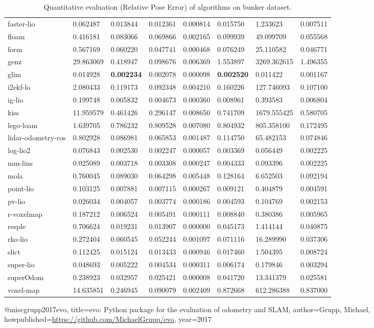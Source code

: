 \begin{table}[]
{\begin{tabular}{llllllll}
		faster-lio & 0.062487 & 0.013844 & 0.012361 & 0.000814 & 0.015750 & 1.233623 & 0.007511 \\
		floam & 0.416181 & 0.083066 & 0.069866 & 0.002165 & 0.099939 & 49.099709 & 0.055568 \\
		form & 0.567169 & 0.060220 & 0.047741 & 0.000468 & 0.076249 & 25.110582 & 0.046771 \\
		genz & 29.863069 & 0.418947 & 0.098676 & 0.006369 & 1.553897 & 3269.362615 & 1.496355 \\
		glim & 0.014928 & \textbf{0.002234} & 0.002078 & 0.000098 & \textbf{0.002520} & 0.011422 & 0.001167 \\
		i2ekf-lo & 2.080433 & 0.119173 & 0.092348 & 0.004210 & 0.160226 & 127.746093 & 0.107100 \\
		ig-lio & 0.199748 & 0.005832 & 0.004673 & 0.000360 & 0.008961 & 0.393583 & 0.006804 \\
		kiss & 11.959579 & 0.461426 & 0.296147 & 0.008650 & 0.741709 & 1679.555425 & 0.580705 \\
		lego-loam & 1.639705 & 0.786232 & 0.809528 & 0.007080 & 0.804932 & 805.358100 & 0.172495 \\
		lidar-odometry-ros & 0.802928 & 0.086981 & 0.065853 & 0.001487 & 0.114750 & 65.482153 & 0.074846 \\
		log-lio2 & 0.076843 & 0.002530 & 0.002247 & 0.000057 & 0.003369 & 0.056449 & 0.002225 \\
		mm-lins & 0.025089 & 0.003718 & 0.003308 & 0.000247 & 0.004333 & 0.093396 & 0.002225 \\
		mola & 0.760045 & 0.089030 & 0.064298 & 0.005448 & 0.128164 & 6.652503 & 0.092194 \\
		point-lio & 0.103125 & 0.007881 & 0.007115 & 0.000267 & 0.009121 & 0.404879 & 0.004591 \\
		pv-lio & 0.026034 & 0.004057 & 0.003774 & 0.000186 & 0.004593 & 0.104769 & 0.002153 \\
		r-voxelmap & 0.187212 & 0.006524 & 0.005491 & 0.000111 & 0.008840 & 0.380386 & 0.005965 \\
		resple & 0.706624 & 0.019231 & 0.013907 & 0.000000 & 0.045173 & 1.414144 & 0.040875 \\
		rko-lio & 0.272404 & 0.060545 & 0.052244 & 0.001097 & 0.071116 & 16.289990 & 0.037306 \\
		slict & 0.112425 & 0.015124 & 0.013433 & 0.000946 & 0.017460 & 1.504395 & 0.008724 \\
		super-lio & 0.048693 & 0.005222 & 0.004534 & 0.000311 & 0.006174 & 0.179846 & 0.003294 \\
		superOdom & 0.238923 & 0.032957 & 0.025421 & 0.000008 & 0.041720 & 13.341379 & 0.025581 \\
		voxel-map & 14.635851 & 0.246945 & 0.090079 & 0.002409 & 0.872668 & 612.286388 & 0.837000 \\
        	\end{tabular}%
        }
        	\caption{Quantitative evaluation (Relative Pose Error\cite{grupp2017evo}) of algorithms on bunker dataset.}
        	\label{table3}
\end{table}

@misc{grupp2017evo,
  title={evo: Python package for the evaluation of odometry and SLAM},
  author={Grupp, Michael},
  howpublished={\url{https://github.com/MichaelGrupp/evo}},
  year={2017}
}
